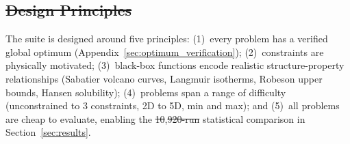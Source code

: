 \documentclass[12pt,a4paper]{article}%
\theoremstyle{plain}%
\theoremstyle{remark}%
\theoremstyle{definition}%
\def\WB{\mathrm{WB}}
\def\BB{\mathrm{BB}}
\providecommand{\DIFaddtex}[1]{{\protect\color{blue}\uwave{#1}}} %
\providecommand{\DIFdeltex}[1]{{\protect\color{red}\sout{#1}}}                      %
\providecommand{\DIFaddbegin}{} %
\providecommand{\DIFaddend}{} %
\providecommand{\DIFdelbegin}{} %
\providecommand{\DIFdelend}{} %
\providecommand{\DIFadd}[1]{\texorpdfstring{\DIFaddtex{#1}}{#1}} %
\providecommand{\DIFdel}[1]{\texorpdfstring{\DIFdeltex{#1}}{}} %
\newcommand{\DIFscaledelfig}{0.5}
\newlength{\DIFdelgraphicswidth} %
\newlength{\DIFdelgraphicsheight} %
\newcommand{\DIFaddincludegraphics}[2][]{{\color{blue}\fbox{\DIFOincludegraphics[#1]{#2}}}} %
\newcommand{\DIFdelincludegraphics}[2][]{%
\sbox{\DIFdelgraphicsbox}{\DIFOincludegraphics[#1]{#2}}%
\settoboxwidth{\DIFdelgraphicswidth}{\DIFdelgraphicsbox} %
\settoboxtotalheight{\DIFdelgraphicsheight}{\DIFdelgraphicsbox} %
\scalebox{\DIFscaledelfig}{%
\parbox[b]{\DIFdelgraphicswidth}{\usebox{\DIFdelgraphicsbox}\\[-\baselineskip] \rule{\DIFdelgraphicswidth}{0em}}\llap{\resizebox{\DIFdelgraphicswidth}{\DIFdelgraphicsheight}{%
\setlength{\unitlength}{\DIFdelgraphicswidth}%
\begin{picture}(1,1)%
\thicklines\linethickness{2pt} %
{\color[rgb]{1,0,0}\put(0,0){\framebox(1,1){}}}%
{\color[rgb]{1,0,0}\put(0,0){\line( 1,1){1}}}%
{\color[rgb]{1,0,0}\put(0,1){\line(1,-1){1}}}%
\end{picture}%
}\hspace*{3pt}}} %
} %
\DeclareRobustCommand{\DIFaddbegin}{\DIFOaddbegin \let\includegraphics\DIFaddincludegraphics} %
\DeclareRobustCommand{\DIFaddend}{\DIFOaddend \let\includegraphics\DIFOincludegraphics} %
\DeclareRobustCommand{\DIFdelbegin}{\DIFOdelbegin \let\includegraphics\DIFdelincludegraphics} %
\DeclareRobustCommand{\DIFdelend}{\DIFOaddend \let\includegraphics\DIFOincludegraphics} %
\begin{document}

\subsection{\DIFdel{Design Principles}}%
\addtocounter{subsection}{-1}%

\DIFdelend The suite is designed around five principles: (1)~every problem has a verified global optimum (Appendix~\ref{sec:optimum_verification}); (2)~constraints are physically motivated; (3)~black-box functions encode realistic structure-property relationships (Sabatier volcano curves, Langmuir isotherms, Robeson upper bounds, Hansen solubility); (4)~problems span a range of difficulty (unconstrained to 3 constraints, 2D to 5D, min and max); and (5)~all problems are cheap to evaluate, enabling the \DIFdelbegin \DIFdel{10}\DIFdelend \DIFaddbegin \DIFadd{8}\DIFaddend {,}\DIFdelbegin \DIFdel{920-run }\DIFdelend \DIFaddbegin \DIFadd{450-run }\DIFaddend statistical comparison in Section~\ref{sec:results}.
\end{document}
